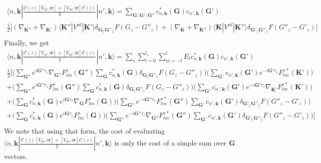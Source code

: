 \documentclass[a4paper,11pt]{report}
\renewcommand{\vec}[1]{\mathbf{#1}}
\newcommand{\bra}{\langle}
\newcommand{\ket}{\rangle}
\begin{document}
\begin{eqnarray}
  \bra
n,\vec{k}|\frac{\mathcal{C}(z)[V_{nl},i\vec{r}]+[V_{nl},i\vec{r}]\mathcal{C}(z)}{2}|n',\vec{k}\ket
= \sum_{\vec{G},\vec{G'},\vec{G''}}
c^*_{n,\vec{k}}(\vec{G})c_{n',\vec{k}}(\vec{G'})\nonumber\\
\frac{1}{2}\Bigg[ (\nabla_{\vec{K''}}+\nabla_{\vec{K'}})\bra
\vec{K''}|V^{nl}|\vec{K'}\ket \delta_{\vec{G}_{||}\vec{G''}_{||}}
F(G_z-G''_z) + (\nabla_{\vec{K}}+\nabla_{\vec{K''}})\bra
\vec{K}|V^{nl}|\vec{K''}\ket\delta_{\vec{G'}_{||}\vec{G''}_{||}}
F(G''_z-G'_z) \Bigg]\nonumber\\
\end{eqnarray}
Finally, we get
\begin{eqnarray}
  \bra
n,\vec{k}|\frac{\mathcal{C}(z)[V_{nl},i\vec{r}]+[V_{nl},i\vec{r}]\mathcal{C}(z)}{2}|n',\vec{k}\ket
= \sum_s\sum_{l=0}^{l_s}\sum_{m=-l}^{l}E_l
c^*_{n,\vec{k}}(\vec{G})c_{n',\vec{k}}(\vec{G'})\nonumber\\
\frac{1}{2}\Bigg[ \Bigg(\sum_{\vec{G''}}e^{i\vec{G''}\tau_s}
\nabla_{\vec{G''}}F_{lm}^s(\vec{G''})
\sum_{\vec{G}}c^*_{n,\vec{k}}(\vec{G})\delta_{\vec{G}_{||}\vec{G''}_{||}} F(G_z-G''_z)
\Bigg)
\Bigg(
\sum_{\vec{G'}}c_{n',\vec{k}}(\vec{G'})e^{-i\vec{G'}\tau_s}F_{lm}^{s*}(\vec{K'})
\Bigg) \nonumber\\
%
+ \Bigg(\sum_{\vec{G''}}e^{i\vec{G''}\tau_s}
F_{lm}^s(\vec{G''})\sum_{\vec{G}}c^*_{n,\vec{k}}(\vec{G})\delta_{\vec{G}_{||}\vec{G''}_{||}}
F(G_z-G''_z) \Bigg)
\Bigg(
\sum_{\vec{G'}}c_{n',\vec{k}}(\vec{G'})e^{-i\vec{G'}\tau_s}\nabla_{\vec{K'}}F_{lm}^{s*}(\vec{K'})
\Bigg)  \nonumber\\
+
\Bigg(\sum_{\vec{G}}c^*_{n,\vec{k}}(\vec{G})e^{i\vec{G}\tau_s}\nabla_{\vec{G}}F_{lm}^s(\vec{G})\Bigg)\Bigg(
\sum_{\vec{G''}}e^{-i\vec{G''}\tau_s}
F_{lm}^{s*}(\vec{G''})\sum_{\vec{G'}}c_{n',\vec{k}}(\vec{G'})\delta_{\vec{G'}_{||}\vec{G''}_{||}}
F(G''_z-G'_z) \Bigg) \nonumber\\
+
\Bigg(\sum_{\vec{G}}c^*_{n,\vec{k}}(\vec{G})e^{i\vec{G}\tau_s}F_{lm}^s(\vec{G})
\Bigg) \Bigg(
\sum_{\vec{G''}}e^{-i\vec{G''}\tau_s}\nabla_{\vec{G''}}F_{lm}^{s*}(\vec{G''})
\sum_{\vec{G'}}c_{n',\vec{k}}(\vec{G'})\delta_{\vec{G'}_{||}\vec{G''}_{||}}
F(G''_z-G'_z) \Bigg) \Bigg]\nonumber\\
\end{eqnarray}
We note that using that form, the cost of evaluating $\bra
n,\vec{k}|\frac{\mathcal{C}(z)[V_{nl},i\vec{r}]+[V_{nl},i\vec{r}]\mathcal{C}(z)}{2}|n',\vec{k}\ket$
is only the cost of a simple sum over $\vec{G}$ vectors.
\end{document}

